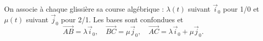 \begin{corrigebox}
On associe à chaque glissière sa course algébrique :
$\lambda(t)$ suivant $\vec i_0$ pour 1/0 et $\mu(t)$ suivant $\vec j_0$ pour
2/1. Les bases sont confondues et
\[\overrightarrow{AB}=\lambda\vec i_0,\quad
  \overrightarrow{BC}=\mu\vec j_0,\quad
  \overrightarrow{AC}=\lambda\vec i_0+\mu\vec j_0.\]
\end{corrigebox}
